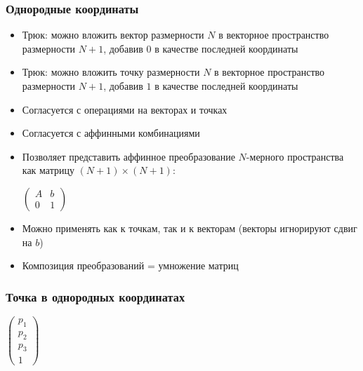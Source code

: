 \documentclass{beamer}
\begin{document}
\begin{frame}[fragile]
\frametitle{Однородные координаты}
\begin{itemize}
\item Трюк: можно вложить вектор размерности \begin{math}N\end{math} в векторное пространство размерности \begin{math}N+1\end{math}, добавив \begin{math}0\end{math} в качестве последней координаты
\pause
\item Трюк: можно вложить точку размерности \begin{math}N\end{math} в векторное пространство размерности \begin{math}N+1\end{math}, добавив \begin{math}1\end{math} в качестве последней координаты
\pause
\item Согласуется с операциями на векторах и точках
\pause
\item Согласуется с аффинными комбинациями
\pause
\item Позволяет представить аффинное преобразование \begin{math}N\end{math}-мерного пространства как матрицу \begin{math}(N+1)\times (N+1)\end{math}:

\begin{center}
\begin{math}
\begin{pmatrix}
A & b \\
0 & 1
\end{pmatrix}
\end{math}
\end{center}
\pause
\item Можно применять как к точкам, так и к векторам (векторы игнорируют сдвиг на \begin{math}b\end{math})
\pause
\item Композиция преобразований = умножение матриц
\end{itemize}
\end{frame}

\begin{frame}[fragile]
\frametitle{Точка в однородных координатах}
\begin{center}
\begin{math}
\begin{pmatrix}
p_1 \\
p_2 \\
p_3 \\
1
\end{pmatrix}
\end{math}
\end{center}
\end{frame}
\end{document}

